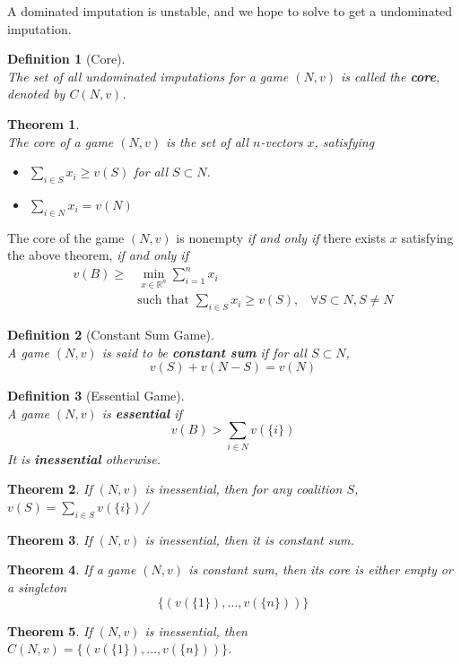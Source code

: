 \documentclass[12pt]{article}
\newtheorem{definition}{Definition}[section]
\newtheorem{theorem}{Theorem}[section]
\theoremstyle{definition}
\begin{document}
A dominated imputation is unstable, and we hope to solve to get a undominated imputation.
\begin{definition}[Core]
\hfill\\\normalfont The set of all undominated imputations for a game $(N, v)$ is called the \textbf{core}, denoted by $C(N, v)$.
\end{definition}
\begin{theorem}
\hfill\\\normalfont The core of a game $(N, v)$ is the set of all $n$-vectors $x$, satisfying
\begin{itemize}
  \item $\sum_{i\in S}x_i\geq v(S)$ for all $S\subset N$.
  \item $\sum_{i\in N}x_i = v(N)$
\end{itemize}
\end{theorem}
The core of the game $(N, v)$ is nonempty \textit{if and only if} there exists $x$ satisfying the above theorem, \textit{if and only if} 
\begin{align*}
v(B)\geq &\min_{x\in \mathbb{R}^n} \sum_{i=1}^n x_i\\
&\text{such that }\sum_{i\in S}x_i\geq v(S), \;\;\;\forall S\subset N, S\neq N
\end{align*}
\begin{definition}[Constant Sum Game]
\hfill\\\normalfont A game $(N, v)$ is said to be \textbf{constant sum} if for all $S\subset N$,
\[
v(S)+v(N-S)=v(N)
\]
\end{definition}
\begin{definition}[Essential Game]
\hfill\\\normalfont A game $(N, v)$ is \textbf{essential} if
\[
v(B)> \sum_{i\in N}v(\{i\})
\]
It is \textbf{inessential} otherwise.
\end{definition}
\begin{theorem}\normalfont If $(N, v)$ is inessential, then for any coalition $S$, $v(S)=\sum_{i\in S}v(\{i\})$/
\end{theorem}
\begin{theorem}\normalfont If $(N, v)$ is inessential, then it is constant sum.
\end{theorem}
\begin{theorem}\normalfont If a game $(N, v)$ is constant sum, then its core is either empty or a singleton
\[
\{(v(\{1\}), \ldots,v(\{n\}) )\}
\]
\end{theorem}
\begin{theorem}\normalfont If $(N, v)$ is inessential, then $C(N, v)=\{(v(\{1\}), \ldots,v(\{n\}) )\}$.
\end{theorem}
\end{document}
